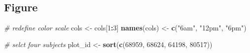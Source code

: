 \documentclass[
]{article}
\newenvironment{Shaded}{\begin{snugshade}}{\end{snugshade}}
\newcommand{\CommentTok}[1]{\textcolor[rgb]{0.56,0.35,0.01}{\textit{#1}}}
\newcommand{\DecValTok}[1]{\textcolor[rgb]{0.00,0.00,0.81}{#1}}
\newcommand{\FunctionTok}[1]{\textcolor[rgb]{0.13,0.29,0.53}{\textbf{#1}}}
\newcommand{\NormalTok}[1]{#1}
\newcommand{\OtherTok}[1]{\textcolor[rgb]{0.56,0.35,0.01}{#1}}
\newcommand{\SpecialCharTok}[1]{\textcolor[rgb]{0.81,0.36,0.00}{\textbf{#1}}}
\newcommand{\StringTok}[1]{\textcolor[rgb]{0.31,0.60,0.02}{#1}}
\begin{document}
\subsection{Figure}\label{figure-1}

\begin{Shaded}
\begin{Highlighting}[]
\CommentTok{\# redefine color scale}
\NormalTok{cols }\OtherTok{\textless{}{-}}\NormalTok{ cols[}\DecValTok{1}\SpecialCharTok{:}\DecValTok{3}\NormalTok{] }
\FunctionTok{names}\NormalTok{(cols) }\OtherTok{\textless{}{-}} \FunctionTok{c}\NormalTok{(}\StringTok{"6am"}\NormalTok{, }\StringTok{"12pm"}\NormalTok{, }\StringTok{"6pm"}\NormalTok{)}

\CommentTok{\# selct four subjects}
\NormalTok{plot\_id }\OtherTok{\textless{}{-}} \FunctionTok{sort}\NormalTok{(}\FunctionTok{c}\NormalTok{(}\DecValTok{68959}\NormalTok{, }\DecValTok{68624}\NormalTok{, }\DecValTok{64198}\NormalTok{, }\DecValTok{80517}\NormalTok{))}


\end{Highlighting}
\end{Shaded}
\end{document}
